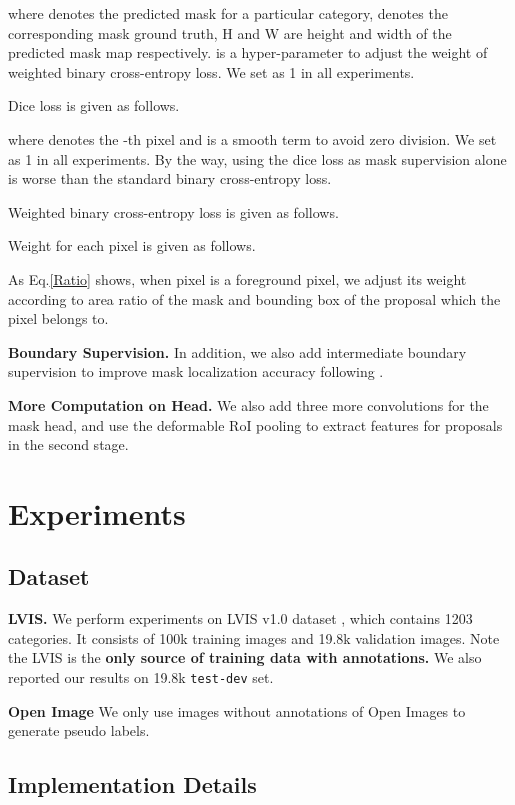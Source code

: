 \documentclass[runningheads]{llncs}
\begin{document}
where  denotes the predicted mask for a particular category,  denotes the corresponding mask ground truth, H and W are height and width of the predicted mask map respectively.  is a hyper-parameter to adjust the weight of weighted binary cross-entropy loss. We set  as 1 in all experiments.

\noindent Dice loss is given as follows.


where  denotes the -th pixel and  is a smooth term to avoid zero division. We set  as 1 in all experiments. By the way, using the dice loss as mask supervision alone is worse than the standard binary cross-entropy loss.

\noindent Weighted binary cross-entropy loss is given as follows.


\noindent Weight for each pixel is given as follows.
 
 As Eq.\ref{Ratio} shows, when pixel  is a foreground pixel, we adjust its weight according to area ratio 
 of the mask and bounding box of the proposal which the pixel  belongs to.
 
  \noindent \textbf{Boundary Supervision.} In addition, we also add intermediate boundary supervision to improve mask localization accuracy following \cite{chengwhl20}.
 
   \noindent \textbf{More Computation on Head.} We also add three more convolutions for the mask head, and use the deformable RoI pooling to extract features for proposals in the second stage.
 
 \section{Experiments}
 
 \subsection{Dataset}
 
 \noindent \textbf{LVIS.} We perform experiments on LVIS v1.0 dataset \cite{gupta2019lvis}, which contains 1203 categories. It consists of 100k training images and 19.8k validation images. Note the LVIS is the \textbf{only source of training data with annotations.} We also reported our results on 19.8k \texttt{test-dev} set.
 
 \noindent \textbf{Open Image} We only use images without annotations of Open Images \cite{Kuznetsova_2020} to generate pseudo labels.
 
 \subsection{Implementation Details}
\end{document}
